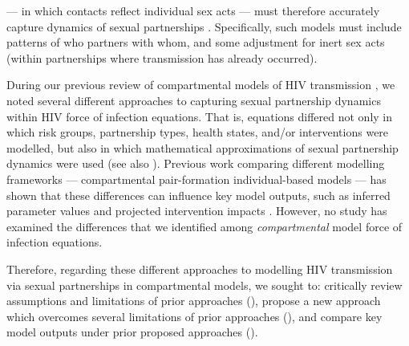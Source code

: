 --- in which contacts reflect individual sex acts ---
must therefore accurately capture dynamics of sexual partnerships \cite{Rao2021}.
Specifically, such models must include patterns of who partners with whom, and
some adjustment for inert sex acts (within partnerships where transmission has already occurred).
\par
During our previous review of compartmental models of HIV transmission \cite{Knight2022sr},
we noted several different approaches to capturing sexual partnership dynamics
within HIV force of infection equations.
That is, equations differed not only in which
risk groups, partnership types, health states, and/or interventions were modelled,
but also in which mathematical approximations of sexual partnership dynamics were used
(see also \cite{Rao2021,Johnson2016mf}).
Previous work comparing different modelling frameworks
--- \ie compartmental \vs pair-formation \vs individual-based models ---
has shown that these differences can influence key model outputs,
such as inferred parameter values and projected intervention impacts
\cite{Kretzschmar1998,Eames2002,Lloyd-Smith2004,Johnson2016mf}.
However, no study has examined the differences that we identified
among \emph{compartmental} model force of infection equations.
\par
Therefore, regarding these different approaches to modelling HIV transmission
via sexual partnerships in compartmental models, we sought to:
critically review assumptions and limitations of prior approaches (),
propose a new approach which overcomes several limitations of prior approaches (),
and compare key model outputs under prior \vs proposed approaches ().
